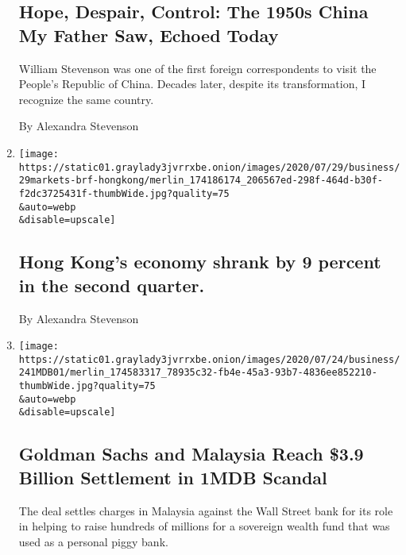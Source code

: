 \begin{enumerate}
  \hypertarget{hope-despair-control-the-1950s-china-my-father-saw-echoed-today}{%
  \subsection{Hope, Despair, Control: The 1950s China My Father Saw,
  Echoed
  Today}\label{hope-despair-control-the-1950s-china-my-father-saw-echoed-today}}

  William Stevenson was one of the first foreign correspondents to visit
  the People's Republic of China. Decades later, despite its
  transformation, I recognize the same country.

  By Alexandra Stevenson
\item
  \href{/2020/07/29/business/hong-kongs-economy-shrank-by-9-percent-in-the-second-quarter.html}{}

  \texttt{[image: https://static01.graylady3jvrrxbe.onion/images/2020/07/29/business/29markets-brf-hongkong/merlin\_174186174\_206567ed-298f-464d-b30f-f2dc3725431f-thumbWide.jpg?quality=75\\\&auto=webp\\\&disable=upscale]}

  \hypertarget{hong-kongs-economy-shrank-by-9-percent-in-the-second-quarter}{%
  \subsection{Hong Kong's economy shrank by 9 percent in the second
  quarter.}\label{hong-kongs-economy-shrank-by-9-percent-in-the-second-quarter}}

  By Alexandra Stevenson
\item
  \href{/2020/07/24/business/goldman-sachs-malaysia-1mdb.html}{}

  \texttt{[image: https://static01.graylady3jvrrxbe.onion/images/2020/07/24/business/241MDB01/merlin\_174583317\_78935c32-fb4e-45a3-93b7-4836ee852210-thumbWide.jpg?quality=75\\\&auto=webp\\\&disable=upscale]}

  \hypertarget{goldman-sachs-and-malaysia-reach-39-billion-settlement-in-1mdb-scandal}{%
  \subsection{Goldman Sachs and Malaysia Reach \$3.9 Billion Settlement
  in 1MDB
  Scandal}\label{goldman-sachs-and-malaysia-reach-39-billion-settlement-in-1mdb-scandal}}

  The deal settles charges in Malaysia against the Wall Street bank for
  its role in helping to raise hundreds of millions for a sovereign
  wealth fund that was used as a personal piggy bank.


\end{enumerate}
